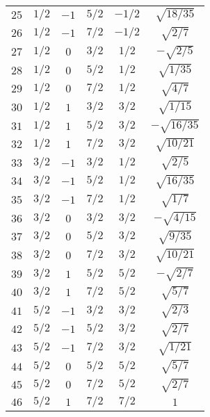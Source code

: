 \begin{table}
\begin{center}
\begin{tabular}{|c|c|c|c|c|c|}
$25$ & $1/2$ & $-1$ & $5/2$ & $-1/2$ & $\sqrt{18/35}$ \\ 
$26$ & $1/2$ & $-1$ & $7/2$ & $-1/2$ & $\sqrt{2/7}$ \\ 
$27$ & $1/2$ & $0$ & $3/2$ & $1/2$ & $-\sqrt{2/5}$ \\ 
$28$ & $1/2$ & $0$ & $5/2$ & $1/2$ & $\sqrt{1/35}$ \\ 
$29$ & $1/2$ & $0$ & $7/2$ & $1/2$ & $\sqrt{4/7}$ \\ 
$30$ & $1/2$ & $1$ & $3/2$ & $3/2$ & $\sqrt{1/15}$ \\ 
$31$ & $1/2$ & $1$ & $5/2$ & $3/2$ & $-\sqrt{16/35}$ \\ 
$32$ & $1/2$ & $1$ & $7/2$ & $3/2$ & $\sqrt{10/21}$ \\ 
$33$ & $3/2$ & $-1$ & $3/2$ & $1/2$ & $\sqrt{2/5}$ \\ 
$34$ & $3/2$ & $-1$ & $5/2$ & $1/2$ & $\sqrt{16/35}$ \\ 
$35$ & $3/2$ & $-1$ & $7/2$ & $1/2$ & $\sqrt{1/7}$ \\ 
$36$ & $3/2$ & $0$ & $3/2$ & $3/2$ & $-\sqrt{4/15}$ \\ 
$37$ & $3/2$ & $0$ & $5/2$ & $3/2$ & $\sqrt{9/35}$ \\ 
$38$ & $3/2$ & $0$ & $7/2$ & $3/2$ & $\sqrt{10/21}$ \\ 
$39$ & $3/2$ & $1$ & $5/2$ & $5/2$ & $-\sqrt{2/7}$ \\ 
$40$ & $3/2$ & $1$ & $7/2$ & $5/2$ & $\sqrt{5/7}$ \\ 
$41$ & $5/2$ & $-1$ & $3/2$ & $3/2$ & $\sqrt{2/3}$ \\ 
$42$ & $5/2$ & $-1$ & $5/2$ & $3/2$ & $\sqrt{2/7}$ \\ 
$43$ & $5/2$ & $-1$ & $7/2$ & $3/2$ & $\sqrt{1/21}$ \\ 
$44$ & $5/2$ & $0$ & $5/2$ & $5/2$ & $\sqrt{5/7}$ \\ 
$45$ & $5/2$ & $0$ & $7/2$ & $5/2$ & $\sqrt{2/7}$ \\ 
$46$ & $5/2$ & $1$ & $7/2$ & $7/2$ & $1$ \\ 
\hline 
\end{tabular}
\end{center}
\end{table}

